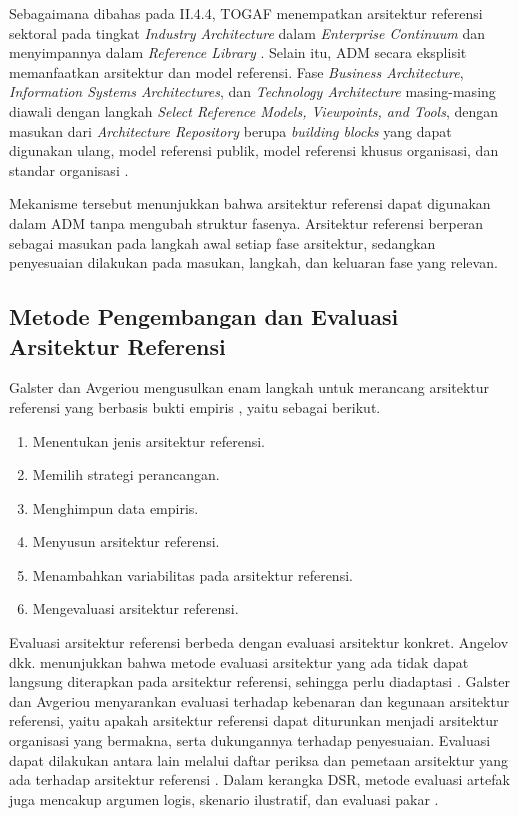 Sebagaimana dibahas pada II.4.4, TOGAF menempatkan arsitektur referensi sektoral pada tingkat \textit{Industry Architecture} dalam \textit{Enterprise Continuum} dan menyimpannya dalam \textit{Reference Library} \cite{TOGAF2022}. Selain itu, ADM secara eksplisit memanfaatkan arsitektur dan model referensi. Fase \textit{Business Architecture}, \textit{Information Systems Architectures}, dan \textit{Technology Architecture} masing-masing diawali dengan langkah \textit{Select Reference Models, Viewpoints, and Tools}, dengan masukan dari \textit{Architecture Repository} berupa \textit{building blocks} yang dapat digunakan ulang, model referensi publik, model referensi khusus organisasi, dan standar organisasi \cite{TOGAF2022}.

Mekanisme tersebut menunjukkan bahwa arsitektur referensi dapat digunakan dalam ADM tanpa mengubah struktur fasenya. Arsitektur referensi berperan sebagai masukan pada langkah awal setiap fase arsitektur, sedangkan penyesuaian dilakukan pada masukan, langkah, dan keluaran fase yang relevan.

\subsection{Metode Pengembangan dan Evaluasi Arsitektur Referensi}
\label{sec:II.6.5}

Galster dan Avgeriou mengusulkan enam langkah untuk merancang arsitektur referensi yang berbasis bukti empiris \cite{Galster2011}, yaitu sebagai berikut.

\begin{enumerate}[label=\arabic*.]
\item Menentukan jenis arsitektur referensi.
\item Memilih strategi perancangan.
\item Menghimpun data empiris.
\item Menyusun arsitektur referensi.
\item Menambahkan variabilitas pada arsitektur referensi.
\item Mengevaluasi arsitektur referensi.
\end{enumerate}

Evaluasi arsitektur referensi berbeda dengan evaluasi arsitektur konkret. Angelov dkk. menunjukkan bahwa metode evaluasi arsitektur yang ada tidak dapat langsung diterapkan pada arsitektur referensi, sehingga perlu diadaptasi \cite{Angelov2008}. Galster dan Avgeriou menyarankan evaluasi terhadap kebenaran dan kegunaan arsitektur referensi, yaitu apakah arsitektur referensi dapat diturunkan menjadi arsitektur organisasi yang bermakna, serta dukungannya terhadap penyesuaian. Evaluasi dapat dilakukan antara lain melalui daftar periksa dan pemetaan arsitektur yang ada terhadap arsitektur referensi \cite{Galster2011}. Dalam kerangka DSR\label{sk:DSR}, metode evaluasi artefak juga mencakup argumen logis, skenario ilustratif, dan evaluasi pakar \cite{Peffers2012}.

